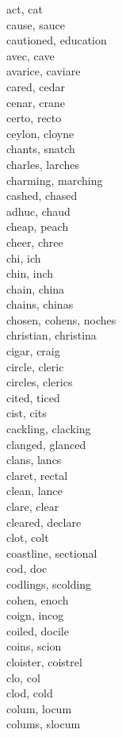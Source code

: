 act, cat\\
cause, sauce\\
cautioned, education\\
avec, cave\\
avarice, caviare\\
cared, cedar\\
cenar, crane\\
certo, recto\\
ceylon, cloyne\\
chants, snatch\\
charles, larches\\
charming, marching\\
cashed, chased\\
adhuc, chaud\\
cheap, peach\\
cheer, chree\\
chi, ich\\
chin, inch\\
chain, china\\
chains, chinas\\
chosen, cohens, noches\\
christian, christina\\
cigar, craig\\
circle, cleric\\
circles, clerics\\
cited, ticed\\
cist, cits\\
cackling, clacking\\
clanged, glanced\\
clans, lancs\\
claret, rectal\\
clean, lance\\
clare, clear\\
cleared, declare\\
clot, colt\\
coastline, sectional\\
cod, doc\\
codlings, scolding\\
cohen, enoch\\
coign, incog\\
coiled, docile\\
coins, scion\\
cloister, coistrel\\
clo, col\\
clod, cold\\
colum, locum\\
colums, slocum\\
